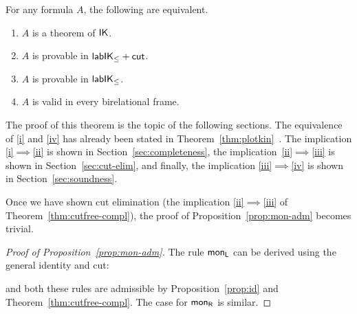 \begin{theorem}\label{thm:cutfree-compl}
	For any formula $A$, the following are equivalent.
	\begin{enumerate}
		\item\label{i} $A$ is a theorem of $\mathsf{IK}$. 
		\item\label{ii} $A$ is provable in $\mathsf{lab}\mathsf{IK}_{\le} +\mathsf{cut}_{}$.
		\item\label{iii} $A$ is provable in $\mathsf{lab}\mathsf{IK}_{\le}$.
		\item\label{iv} $A$ is valid in every birelational frame. %
	\end{enumerate}
\end{theorem}

The proof of this theorem is the topic of the following sections. The
equivalence of \ref{i} and \ref{iv} has already been stated in
Theorem~\ref{thm:plotkin}~\cite{fischer-servi:84, plotkin:stirling:86}. The implication
\ref{i}$\implies$\ref{ii} is shown in Section~\ref{sec:completeness},
the implication~\ref{ii}$\implies$\ref{iii} is shown in
Section~\ref{sec:cut-elim}, and finally, the implication \ref{iii}$\implies$\ref{iv} is shown in Section~\ref{sec:soundness}.

Once we have shown cut elimination (the implication \ref{ii}$\implies$\ref{iii} of Theorem~\ref{thm:cutfree-compl}), the proof of Proposition~\ref{prop:mon-adm} becomes trivial.

\begin{proof}[Proof of Proposition~\ref{prop:mon-adm}]
  The rule $\mathsf{mon}_{\mathsf{L}}$ can be derived using the general identity and cut:
  \begin{smallequation*}
  \end{smallequation*}
  and both these rules are admissible by Proposition~\ref{prop:id} and
  Theorem~\ref{thm:cutfree-compl}. The case for $\mathsf{mon}_{\mathsf{R}}$ is
  similar.
\end{proof}

